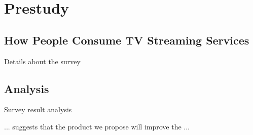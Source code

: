 \section{Prestudy}

\subsection{How People Consume TV Streaming Services}
Details about the survey

\subsection{Analysis}
Survey result analysis

... suggests that the product we propose will improve the ...
